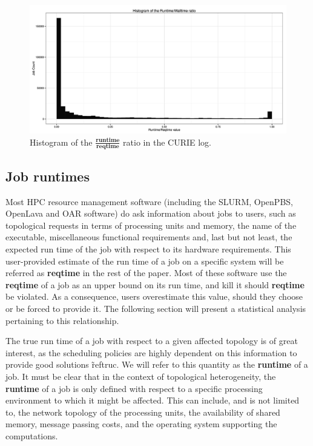 \documentclass{article}
\begin{document}
\begin{figure}[b]
  \centering
  \includegraphics[width=\textwidth]{../../wallimage-1.png}
  \caption{Histogram of the $\frac{\textbf{runtime}}{\textbf{reqtime}}$ ratio in the CURIE log.}
  \label{fig:ratio}
\end{figure}

\subsection{Job runtimes}
Most HPC resource management software (including the SLURM, OpenPBS, OpenLava and OAR software) do ask information about jobs to users, such as topological requests in terms of processing units and memory, the name of the executable, miscellaneous functional requirements and, last but not least, the expected run time of the job with respect to its hardware requirements.
This user-provided estimate of the run time of a job on a specific system will be referred as \textbf{reqtime} in the rest of the paper. Most of these software use the \textbf{reqtime} of a job as an upper bound on its run time, and kill it should \textbf{reqtime} be violated. As a consequence, users overestimate this value, should they choose or be forced to provide it. The following section will present a statistical analysis pertaining to this relationship.

The true run time of a job with respect to a given affected topology is of great interest, as the scheduling policies are highly dependent on this information to provide good solutions \~ref{truc}. We will refer to this quantity as the \textbf{runtime} of a job.
It must be clear that in the context of topological heterogeneity, the \textbf{runtime} of a job is only defined with respect to a specific processing environment to which it might be affected.
This can include, and is not limited to, the network topology of the processing units, the availability of shared memory, message passing costs, and the operating system supporting the computations.
\end{document}

